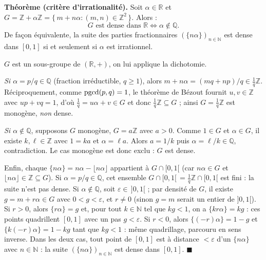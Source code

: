 \decsep{}


\begin{tcolorbox}[thmbox]
  \textbf{Théorème (critère d'irrationalité).}\enspace%
  Soit $\alpha \in \mathbb{R}$ et $G = \mathbb{Z} + \alpha\mathbb{Z}
  = \{\,m + n\alpha : (m,n) \in \mathbb{Z}^2\,\}$. Alors :
  \[
    G \text{ est dense dans } \mathbb{R} \iff \alpha \notin \mathbb{Q}.
  \]
  De façon équivalente, la suite des parties fractionnaires $(\{n\alpha\})_{n\in\mathbb{N}}$
  est dense dans $[0,1]$ si et seulement si $\alpha$ est irrationnel.
\end{tcolorbox}


\begin{mdframed}[style=proofbar]
  $G$ est un sous-groupe de $(\mathbb{R},+)$, on lui applique la dichotomie.

  \smallskip\noindent
  \textit{Si $\alpha = p/q \in \mathbb{Q}$} (fraction irréductible, $q \geq 1$),
  alors $m + n\alpha = (mq + np)/q \in \tfrac{1}{q}\mathbb{Z}$. Réciproquement,
  comme $\operatorname{pgcd}(p,q) = 1$, le théorème de Bézout fournit $u,v \in \mathbb{Z}$ avec
  $up + vq = 1$, d'où $\tfrac1q = u\alpha + v \in G$ et donc
  $\tfrac1q\mathbb{Z} \subseteq G$ ; ainsi $G = \tfrac1q\mathbb{Z}$ est monogène,
  \emph{non} dense.

  \smallskip\noindent
  \textit{Si $\alpha \notin \mathbb{Q}$}, supposons $G$ monogène, $G = a\mathbb{Z}$
  avec $a > 0$. Comme $1 \in G$ et $\alpha \in G$, il existe $k, \ell \in \mathbb{Z}$
  avec $1 = ka$ et $\alpha = \ell a$. Alors $a = 1/k$ puis $\alpha = \ell/k \in \mathbb{Q}$,
  contradiction. Le cas monogène est donc exclu : $G$ est dense.

  \smallskip\noindent
  Enfin, chaque $\{n\alpha\} = n\alpha - \lfloor n\alpha\rfloor$ appartient à
  $G \cap [0,1[$ (car $n\alpha \in G$ et $\lfloor n\alpha\rfloor \in \mathbb{Z}
  \subseteq G$). Si $\alpha = p/q \in \mathbb{Q}$, cet ensemble
  $G \cap [0,1[\, = \tfrac1q\mathbb{Z} \cap [0,1[$ est fini : la suite n'est pas
  dense. Si $\alpha \notin \mathbb{Q}$, soit $\varepsilon \in \,]0,1[$ ; par
  densité de $G$, il existe $g = m + r\alpha \in G$ avec $0 < g < \varepsilon$,
  et $r \neq 0$ (sinon $g = m$ serait un entier de $]0,1[$). Si $r > 0$, alors
  $\{r\alpha\} = g$ et, pour tout $k \in \mathbb{N}$ tel que $kg < 1$, on a
  $\{kr\alpha\} = kg$ : ces points quadrillent $[0,1]$ avec un pas $g < \varepsilon$.
  Si $r < 0$, alors $\{(-r)\alpha\} = 1 - g$ et $\{k(-r)\alpha\} = 1 - kg$ tant
  que $kg < 1$ : même quadrillage, parcouru en sens inverse. Dans les deux cas,
  tout point de $[0,1]$ est à distance $< \varepsilon$ d'un $\{n\alpha\}$ avec
  $n \in \mathbb{N}$ : la suite $(\{n\alpha\})_{n\in\mathbb{N}}$ est dense dans
  $[0,1]$.
  \hfill$\blacksquare$
\end{mdframed}


